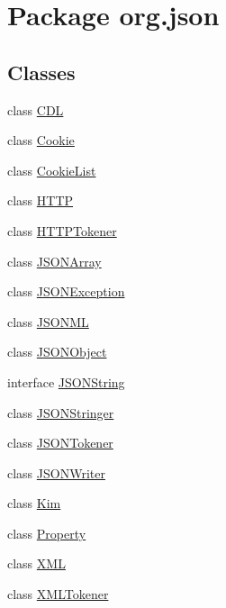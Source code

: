 \hypertarget{namespaceorg_1_1json}{\section{Package org.\-json}
\label{namespaceorg_1_1json}
}
\subsection*{Classes}
\begin{DoxyCompactItemize}
\item 
class \hyperlink{classorg_1_1json_1_1_c_d_l}{C\-D\-L}
\item 
class \hyperlink{classorg_1_1json_1_1_cookie}{Cookie}
\item 
class \hyperlink{classorg_1_1json_1_1_cookie_list}{Cookie\-List}
\item 
class \hyperlink{classorg_1_1json_1_1_h_t_t_p}{H\-T\-T\-P}
\item 
class \hyperlink{classorg_1_1json_1_1_h_t_t_p_tokener}{H\-T\-T\-P\-Tokener}
\item 
class \hyperlink{classorg_1_1json_1_1_j_s_o_n_array}{J\-S\-O\-N\-Array}
\item 
class \hyperlink{classorg_1_1json_1_1_j_s_o_n_exception}{J\-S\-O\-N\-Exception}
\item 
class \hyperlink{classorg_1_1json_1_1_j_s_o_n_m_l}{J\-S\-O\-N\-M\-L}
\item 
class \hyperlink{classorg_1_1json_1_1_j_s_o_n_object}{J\-S\-O\-N\-Object}
\item 
interface \hyperlink{interfaceorg_1_1json_1_1_j_s_o_n_string}{J\-S\-O\-N\-String}
\item 
class \hyperlink{classorg_1_1json_1_1_j_s_o_n_stringer}{J\-S\-O\-N\-Stringer}
\item 
class \hyperlink{classorg_1_1json_1_1_j_s_o_n_tokener}{J\-S\-O\-N\-Tokener}
\item 
class \hyperlink{classorg_1_1json_1_1_j_s_o_n_writer}{J\-S\-O\-N\-Writer}
\item 
class \hyperlink{classorg_1_1json_1_1_kim}{Kim}
\item 
class \hyperlink{classorg_1_1json_1_1_property}{Property}
\item 
class \hyperlink{classorg_1_1json_1_1_x_m_l}{X\-M\-L}
\item 
class \hyperlink{classorg_1_1json_1_1_x_m_l_tokener}{X\-M\-L\-Tokener}
\end{DoxyCompactItemize}
